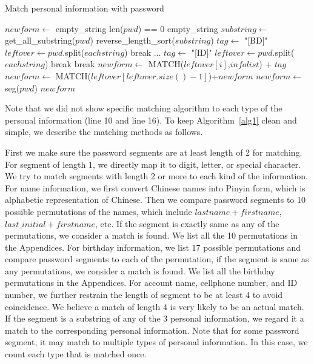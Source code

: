 \documentclass{sig-alternate}
\begin{document}
\begin{algorithm}[!]
\caption{Match personal information with password}
\label{alg1}
\begin{algorithmic}[1]
\State $newform \gets$ empty\_string
\If len($pwd$) == 0
\State \Return empty\_string
\EndIf
\State $substring \gets$ get\_all\_substring($pwd$)
\State reverse\_length\_sort($substring$)
\State $tag \gets $ "[BD]"
\State $leftover \gets pwd$.split($eachstring$)
\State break
\EndIf
\State $\ldots$
\State $tag \gets$ "[ID]"
\State $leftover \gets pwd$.split($eachstring$)
\State break
\EndIf
\Else
\State break
\EndIf
\EndFor
{}
\State $newform \gets$ MATCH($leftover[i]$,$infolist$) + $tag$
\EndFor
\State $newform \gets$  MATCH($leftover[leftover.size()-1]$)+$newform$
\Else
\State $newform \gets$ seg($pwd$)
\EndIf
\State \Return $newform$
\EndProcedure
\end{algorithmic}
\end{algorithm}

Note that we did not show specific matching algorithm to each type of the personal information (line 10 and line 16). To keep Algorithm~\ref{alg1} clean and simple, we describe the matching methods as follows.

First we make sure the password segments are at least length of 2 for matching. For segment of length 1, we directly map it to digit, letter, or special character. We try to match segments with length 2 or more to each kind of the information. For name information, we first convert Chinese names into Pinyin form, which is alphabetic representation of Chinese. Then we compare password segments to 10 possible permutations of the names, which include $lastname + firstname$, $last\_initial+firstname$, etc. If the segment is exactly same as any of the permutations, we consider a match is found. We list all the 10 permutations in the Appendices. For birthday information, we list 17 possible permutations and compare password segments to each of the permutation, if the segment is same as any permutations, we consider a match is found. We list all the birthday permutations in the Appendices. For account name, cellphone number, and ID number, we further restrain the length of segment to be at least 4 to avoid coincidence. We believe a match of length 4 is very likely to be an actual match. If the segment is a substring of any of the 3 personal information, we regard it a match to the corresponding personal information. Note that for some password segment, it may match to multiple types of personal information. In this case, we count each type that is matched once.
\end{document}
